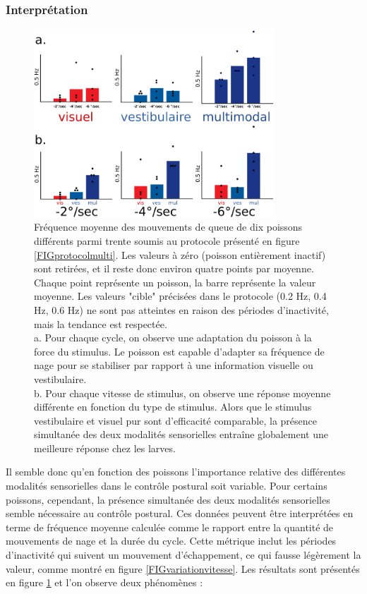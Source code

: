 \subsubsection{Interprétation}

\begin{figure}
    \centering
    \includegraphics[width=0.8\textwidth]{./files/stats.svg.png}
    \caption{
    Fréquence moyenne des mouvements de queue de dix poissons différents parmi trente soumis au protocole présenté en figure \ref{FIGprotocolmulti}. Les valeurs à zéro (poisson entièrement inactif) sont retirées, et il reste donc environ quatre points par moyenne. Chaque point représente un poisson, la barre représente la valeur moyenne. Les valeurs "cible" précisées dans le protocole (0.2 Hz, 0.4 Hz, 0.6 Hz) ne sont pas atteintes en raison des périodes d'inactivité, mais la tendance est respectée.
    \\ a. Pour chaque cycle, on observe une adaptation du poisson à la force du stimulus. Le poisson est capable d'adapter sa fréquence de nage pour se stabiliser par rapport à une information visuelle ou vestibulaire.
    \\ b. Pour chaque vitesse de stimulus, on observe une réponse moyenne différente en fonction du type de stimulus. Alors que le stimulus vestibulaire et visuel pur sont d'efficacité comparable, la présence simultanée des deux modalités sensorielles entraîne globalement une meilleure réponse chez les larves.
    \label{FIGstatsmultimodal}}
    \end{figure}

Il semble donc qu'en fonction des poissons l'importance relative des différentes modalités sensorielles dans le contrôle postural soit variable. Pour certains poissons, cependant, la présence simultanée des deux modalités sensorielles semble nécessaire au contrôle postural. Ces données peuvent être interprétées en terme de fréquence moyenne calculée comme le rapport entre la quantité de mouvements de nage et la durée du cycle. Cette métrique inclut les périodes d'inactivité qui suivent un mouvement d'échappement, ce qui fausse légèrement la valeur, comme montré en figure \ref{FIGvariationvitesse}. Les résultats sont présentés en figure \ref{FIGstatsmultimodal} et l'on observe deux phénomènes :

